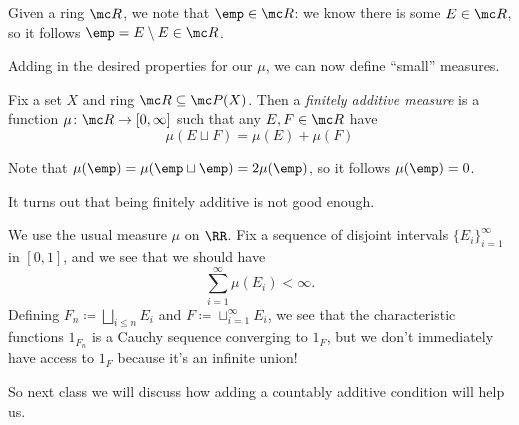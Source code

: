 \documentclass[../notes.tex]{subfiles}
\begin{document}
\begin{remark}
	Given a ring $\mc R$, we note that $\emp\in\mc R$: we know there is some $E\in\mc R$, so it follows $\emp=E\setminus E\in\mc R$.
\end{remark}
Adding in the desired properties for our $\mu$, we can now define ``small'' measures.
\begin{definition}
	Fix a set $X$ and ring $\mc R\subseteq\mc P(X)$. Then a \textit{finitely additive measure} is a function $\mu\colon\mc R\to[0,\infty]$ such that any $E,F\in\mc R$ have
	\[\mu(E\sqcup F)=\mu(E)+\mu(F)\]
\end{definition}
\begin{remark}
	Note that $\mu(\emp)=\mu(\emp\sqcup\emp)=2\mu(\emp)$, so it follows $\mu(\emp)=0$.
\end{remark}
It turns out that being finitely additive is not good enough.
\begin{example}
	We use the usual measure $\mu$ on $\RR$. Fix a sequence of disjoint intervals $\{E_i\}_{i=1}^\infty$ in $[0,1]$, and we see that we should have
	\[\sum_{i=1}^\infty\mu(E_i)<\infty.\]
	Defining $F_n\coloneqq\bigsqcup_{i\le n}E_i$ and $F\coloneqq\sqcup_{i=1}^\infty E_i$, we see that the characteristic functions $1_{F_n}$ is a Cauchy sequence converging to $1_F$, but we don't immediately have access to $1_F$ because it's an infinite union!
\end{example}
So next class we will discuss how adding a countably additive condition will help us.
\end{document}
